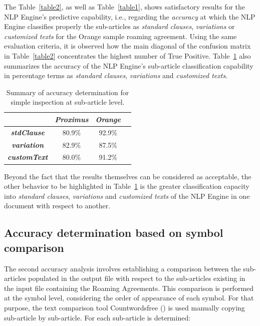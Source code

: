 \documentclass[conference]{style/IEEEtran}
\begin{document}
The Table~\ref{table2}, as well as Table~\ref{table1}, shows satisfactory results for the NLP Engine's predictive capability, i.e., regarding the \textit{accuracy} at which the NLP Engine classifies properly the sub-articles as \textit{standard clauses}, \textit{variations} or \textit{customized texts} for the Orange sample roaming agreement. Using the same evaluation criteria, it is observed how the main diagonal of the confusion matrix in Table~\ref{table2} concentrates the highest number of True Positive. Table~\ref{table3} also summarizes the accuracy of the NLP Engine's sub-article classification capability in percentage terms as \textit{standard clauses}, \textit{variations} and \textit{customized texts}.

\begin{table}[htbp]
\caption{Summary of accuracy determination for simple inspection at sub-article level.}
\begin{center}
\begin{tabular}{|c|c|c|c|}
\hline
\textbf{} & \textbf{\textit{Proximus}}& \textbf{\textit{Orange}} \\
\hline
\textbf{\textit{stdClause}}& 80.9\% & 92.9\% \\
\hline
\textbf{\textit{variation}}& 82.9\% & 87.5\% \\
\hline
\textbf{\textit{customText}}& 80.0\% & 91.2\% \\
\hline
\end{tabular}
\label{table3}
\end{center}
\end{table}

Beyond the fact that the results themselves can be considered as acceptable, the other behavior to be highlighted in Table~\ref{table3} is the greater classification capacity into \textit{standard clauses}, \textit{variations} and \textit{customized texts} of the NLP Engine in one document with respect to another.

\subsection{Accuracy determination based on symbol comparison}
The second accuracy analysis involves establishing a comparison between the sub-articles populated in the output file with respect to the sub-articles existing in the input file containing the Roaming Agreements. This comparison is performed at the symbol level, considering the order of appearance of each symbol. For that purpose, the text comparison tool Countwordsfree (\cite{countwordsfree}) is used manually copying sub-article by sub-article. For each sub-article is determined:
\end{document}
